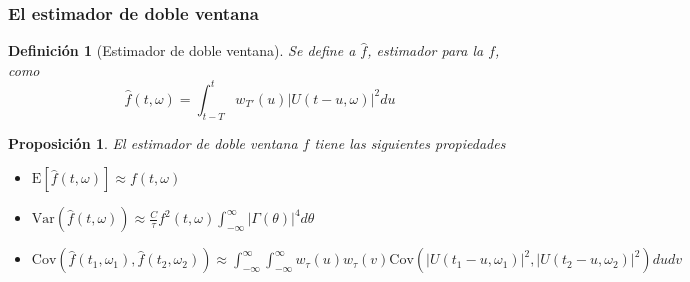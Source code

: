 \documentclass[11pt]{beamer}
\newtheorem{defn}{Definici\'on}
\newtheorem{prop}{Proposici\'on}
\newcommand{\intR}{\int_{-\infty}^{\infty}}
\newcommand{\est}[1]{\widehat{ #1 }}
\newcommand{\E}[1]{\mathrm{E}\left[ #1 \right]}
\newcommand{\Var}[1]{\mathrm{Var}\left( #1 \right)}
\newcommand{\Cov}[1]{\mathrm{Cov}\left( #1 \right)}
\newcommand{\abso}[1]{\left| #1 \right|}
\begin{document}
\begin{frame}\frametitle{El estimador de doble ventana}
\begin{defn}[Estimador de doble ventana]
Se define a $\est{f}$, estimador para la $f$, como
\begin{equation*}
\widehat{f}(t,\omega) = \int_{t-T}^{t} w_{T'}(u) \lvert U(t-u,\omega) \lvert^{2} du
\end{equation*}

%
\end{defn}
\end{frame}


\begin{frame}%
\begin{prop}
El estimador de doble ventana $\widehat{f}$ tiene las siguientes propiedades
\begin{itemize}
\item $\displaystyle \E{\est{f}(t,\omega)} \approx f(t,\omega)$
\item $\displaystyle \Var{\est{f}(t,\omega)} \approx 
\frac{C}{\tau} f^{2}(t,\omega) \intR \abso{\Gamma (\theta)}^{4} d\theta$
\item $\displaystyle \Cov{\est{f}(t_1,\omega_1) , \est{f}(t_2,\omega_2)} \approx \intR \intR
w_\tau (u) w_\tau(v) \Cov{ \abso{U(t_1-u,\omega_1)}^{2} , \abso{U(t_2-u,\omega_2)}^{2} } du dv$
\end{itemize}
\end{prop}
\end{frame}
\end{document}
